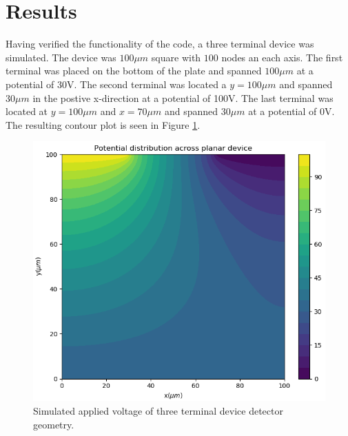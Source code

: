 \documentclass{article}[12pt]
\begin{document}
\section{Results}
Having verified the functionality of the code, a three terminal device was simulated. The device was $100\mu m$ square with $100$ nodes an each axis. The first terminal was placed on the bottom of the plate and spanned $100\mu m$ at a potential of 30V.  The second terminal was located a $y=100\mu m$ and spanned $30\mu m$ in the postive x-direction at a potential of 100V. The last terminal was located at $y=100\mu m$ and $x=70\mu m$ and spanned $30 \mu m$ at a potential of 0V. The resulting contour plot is seen in Figure \ref{fig:three_terminal}.
\begin{figure}[h!]
	\centering
	\includegraphics[width=\linewidth]{three_terminal.png}
	\caption{Simulated applied voltage of three terminal device detector geometry.}
	\label{fig:three_terminal}
\end{figure}
\end{document}
